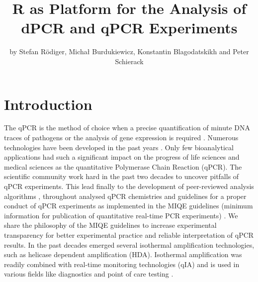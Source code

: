 \title{R as Platform for the Analysis of dPCR and qPCR Experiments}
\author{by Stefan R\"{o}diger, Micha\l{} Burdukiewicz, Konstantin 
Blagodatskikh and Peter Schierack}

\maketitle


\section{Introduction}

The qPCR is the method of choice when a precise quantification of minute DNA 
traces of pathogens or the analysis of gene expression is required 
\citep{peirson_2003}. Numerous technologies have been developed in the past 
years \citep{rodiger_highly_2013, devonshire_2013, viturro_2014, 
rodiger_nucleic_2014, khodakov_2014}. Only few bioanalytical applications had such a 
significant impact on the progress of life sciences and medical sciences as the 
quantitative Polymerase Chain Reaction (qPCR). The scientific community work 
hard in the past two decades to uncover pitfalls of qPCR experiments. This lead 
finally to the development of peer-reviewed analysis algorithms 
\citep{ruijter_2013}, throughout analysed qPCR chemistries \citep{ruijter_2014} 
and guidelines for a proper conduct of qPCR experiments as implemented in the 
MIQE guidelines (minimum information for publication of quantitative real-time 
PCR experiments) \citep{bustin_miqe_2009, huggett_2013}. We share the philosophy 
of the MIQE guidelines to increase experimental transparency for better 
experimental practice and reliable interpretation of qPCR results. In the past 
decades emerged several isothermal amplification technologies, such as helicase 
dependent amplification (HDA). Isothermal amplification was readily combined 
with real-time monitoring technologies (qIA) and is used in various fields like 
diagnostics and point of care testing \citep{rodiger_nucleic_2014}.

